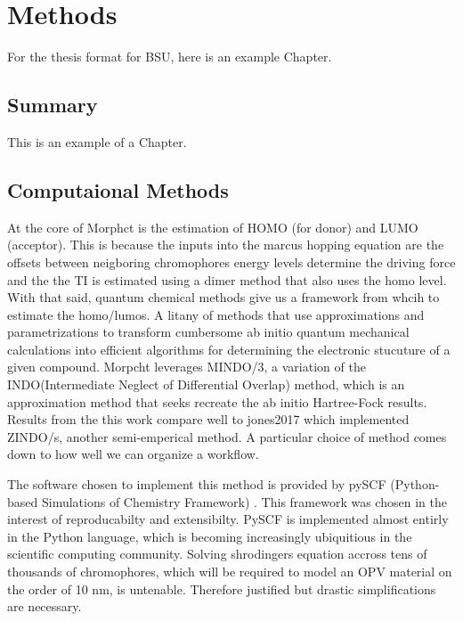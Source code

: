 \chapter{Methods}
\label{chap:methods}

For the thesis format for BSU, here is an example Chapter.

\section{Summary}
 
This is an example of a Chapter. 

\section{Computaional Methods}

At the core of Morphct is the estimation of HOMO (for donor) and LUMO (acceptor). This is because 
the inputs into the marcus hopping equation are the offsets between neigboring  chromophores energy levels
determine the driving force and the the TI is estimated using a dimer method that also uses the homo level. 
With that said, quantum chemical methods give us a framework from whcih to estimate the homo/lumos. A litany of
methods that use approximations and parametrizations to transform cumbersome ab initio quantum mechanical 
calculations into efficient algorithms for determining the electronic stucuture of a given compound. Morpcht 
leverages MINDO/3, a variation of the INDO(Intermediate Neglect of Differential Overlap) method,
which is an approximation method that seeks recreate the ab initio Hartree-Fock results\cite{Thiel2014}. Results
from the this work compare well to jones2017 which implemented ZINDO/s, another semi-emperical method. A particular 
choice of method comes down to how well we can organize a workflow. 

\indent The software chosen to implement this method is
provided by pySCF (Python-based Simulations of Chemistry Framework) \cite{Sun2018a}. This framework
was chosen in the interest of reproducabilty and extensibilty. PySCF is implemented almost entirly in the Python 
language, which is becoming increasingly ubiquitious in the scientific computing community.
Solving shrodingers equation accross tens of thousands of 
chromophores, which will be required to model an OPV material on the order of 10 nm, is untenable. Therefore
justified but drastic simplifications are necessary. 

